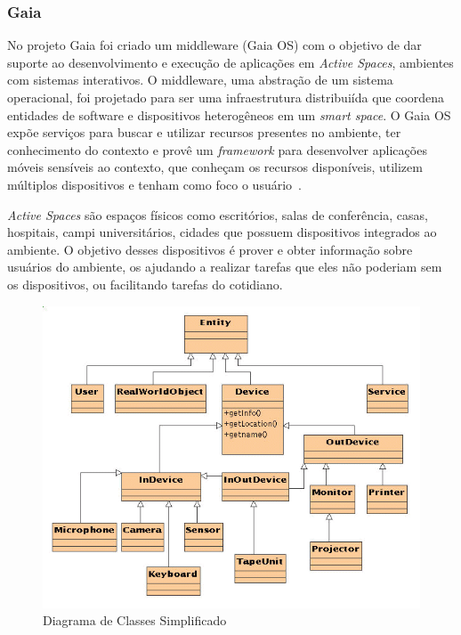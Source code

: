 \subsubsection{Gaia}
No projeto Gaia foi criado um middleware (Gaia OS) com o objetivo de dar suporte ao desenvolvimento e execução de aplicações em \emph{Active Spaces}, ambientes com sistemas interativos. O middleware, uma abstração de um sistema operacional, foi projetado para ser uma infraestrutura distribuiída que coordena entidades de software e dispositivos heterogêneos em um \emph{smart space}. O Gaia OS expõe serviços para buscar e utilizar recursos presentes no ambiente, ter conhecimento do contexto e provê um \emph{framework} para desenvolver aplicações móveis sensíveis ao contexto, que conheçam os recursos disponíveis, utilizem múltiplos dispositivos e tenham como foco o usuário~\cite{gaia2002}.

\emph{Active Spaces} são espaços físicos como escritórios, salas de conferência, casas, hospitais, campi universitários, cidades que possuem dispositivos integrados ao ambiente. O objetivo desses dispositivos é prover e obter informação sobre usuários do ambiente, os ajudando a realizar tarefas que eles não poderiam sem os dispositivos, ou facilitando tarefas do cotidiano.

\begin{figure}[ht]
\center
\includegraphics[scale=0.8]{imagens/gaia-devices}
\caption{Diagrama de Classes Simplificado~\cite{gaiaDevices}}
\label{fig:gaiaClassDiagram}
\end{figure}

